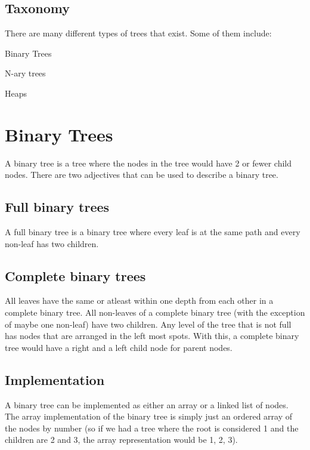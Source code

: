 \documentclass[11pt,a4paper,english]{paper}
\begin{document}
\bigskip

\subsection{Taxonomy}

There are many different types of trees that exist. Some of them include:
\begin{itemize} {

    \item Binary Trees
    \item N-ary trees
    \item Heaps

}\end{itemize}

\section{Binary Trees}

A binary tree is a tree where the nodes in the tree would have 2 or fewer child nodes. There are two adjectives that can be used to describe a binary tree.

\subsection{Full binary trees}

A full binary tree is a binary tree where every leaf is at the same path and every non-leaf has two children.

\subsection{Complete binary trees}

All leaves have the same or atleast within one depth from each other in a complete binary tree. All non-leaves of a complete binary tree (with the exception of maybe one non-leaf) have two children. Any level of the tree that is not full has nodes that are arranged in the left most spots. With this, a complete binary tree would have a right and a left child node for parent nodes.

\subsection{Implementation}

A binary tree can be implemented as either an array or a linked list of nodes. The array implementation of the binary tree is simply just an ordered array of the nodes by number (so if we had a tree where the root is considered 1 and the children are 2 and 3, the array representation would be 1, 2, 3).
\end{document}

